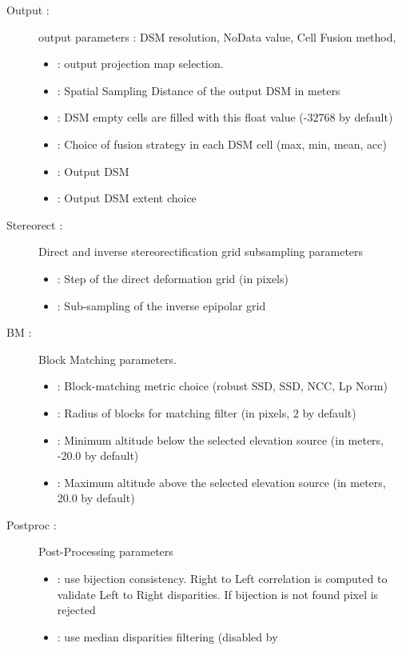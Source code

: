\begin{description}
\item[Output :] output parameters : DSM resolution, NoData value, Cell Fusion
method, 
 \begin{itemize}
\item {} : output projection map selection.
\item {} : Spatial Sampling Distance of the output
DSM in meters
\item {} : DSM empty cells are filled with this float value
(-32768 by default)
\item {} : Choice of fusion strategy in each DSM cell
(max, min, mean, acc) 
\item {} :  Output DSM
\item {} : Output DSM extent choice
\end{itemize} 
\item[Stereorect :] Direct and inverse stereorectification grid subsampling
parameters
 \begin{itemize}
\item {} : Step of the direct deformation grid (in
pixels)
\item {} : Sub-sampling of the inverse epipolar
grid
\end{itemize}
\item[BM : ] Block Matching parameters.
\begin{itemize}
 \item {} : Block-matching metric choice (robust SSD, SSD, NCC,
 Lp Norm) 
 \item {} : Radius of blocks for matching filter (in pixels,
 $2$ by default)
 \item {} : Minimum altitude below the
 selected elevation source (in meters, -20.0 by default)
 \item {} : Maximum altitude above the
 selected elevation source (in meters, 20.0 by default)
\end{itemize}
\item[Postproc : ] Post-Processing parameters
 \begin{itemize}
 \item {} : use bijection consistency. Right to Left
 correlation is computed to validate Left to Right disparities. If bijection is not found pixel is rejected
\item {} :  use median disparities filtering (disabled by

\end{itemize}
\end{description}
